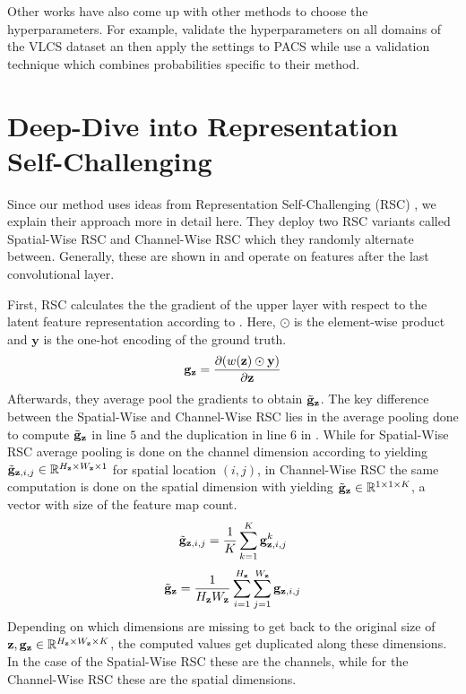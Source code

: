 Other works have also come up with other methods to choose the hyperparameters. For example, \citet{krueger2020outofdistribution} validate the hyperparameters on all domains of the VLCS dataset an then apply the settings to PACS while \citet{DInnocenteC18} use a validation technique which  combines probabilities specific to their method. 

\section{Deep-Dive into Representation Self-Challenging}
\label{sec:RSC}
Since our method uses ideas from Representation Self-Challenging (RSC) \citep{huang2020selfchallenging}, we explain their approach more in detail here. They deploy two RSC variants called Spatial-Wise RSC and Channel-Wise RSC which they randomly alternate between. Generally, these are shown in  and operate on features after the last convolutional layer. 

First, RSC calculates the the gradient of the upper layer with respect to the latent feature representation according to . Here, $\odot$ is the element-wise product and $\mathbf{y}$ is the one-hot encoding of the ground truth.
\begin{equation}
    \mathbf{g}_\mathbf{z} = \frac{\partial( w(\mathbf{z}) \odot \mathbf{y})}{\partial \mathbf{z}}
    \label{eq:gz}
\end{equation}
Afterwards, they average pool the gradients to obtain $\Tilde{\mathbf{g}}_\mathbf{z}$. The key difference between the Spatial-Wise and Channel-Wise RSC lies in the average pooling done to compute $\Tilde{\mathbf{g}}_\mathbf{z}$ in line $5$ and the duplication in line $6$ in . While for Spatial-Wise RSC average pooling is done on the channel dimension according to  yielding $\Tilde{\mathbf{g}}_{\mathbf{z}, i, j} \in \mathbb{R}^{H_\mathbf{z} \times W_\mathbf{z} \times 1}$ for spatial location $(i,j)$, in Channel-Wise RSC the same computation is done on the spatial dimension with  yielding $\Tilde{\mathbf{g}}_\mathbf{z} \in \mathbb{R}^{1 \times 1 \times K}$, a vector with size of the feature map count.
\begin{equation}
\label{eq:SpatialRSCavg}
     \Tilde{\mathbf{g}}_{\mathbf{z}, i, j} = \frac{1}{K} \sum_{k=1}^K \mathbf{g}_{\mathbf{z},i,j}^k
\end{equation}
\begin{equation}
\label{eq:ChannelRSCavg}
     \Tilde{\mathbf{g}}_\mathbf{z} = \frac{1}{H_\mathbf{z}W_\mathbf{z}} \sum_{i=1}^{H_\mathbf{z}} \sum_{j=1}^{W_\mathbf{z}} \mathbf{g}_{\mathbf{z},i,j}
\end{equation}
Depending on which dimensions are missing to get back to the original size of $\mathbf{z}, \mathbf{g}_\mathbf{z} \in \mathbb{R}^{H_\mathbf{z} \times W_\mathbf{z} \times K}$, the computed values get duplicated along these dimensions. In the case of the Spatial-Wise RSC these are the channels, while for the Channel-Wise RSC these are the spatial dimensions. 

